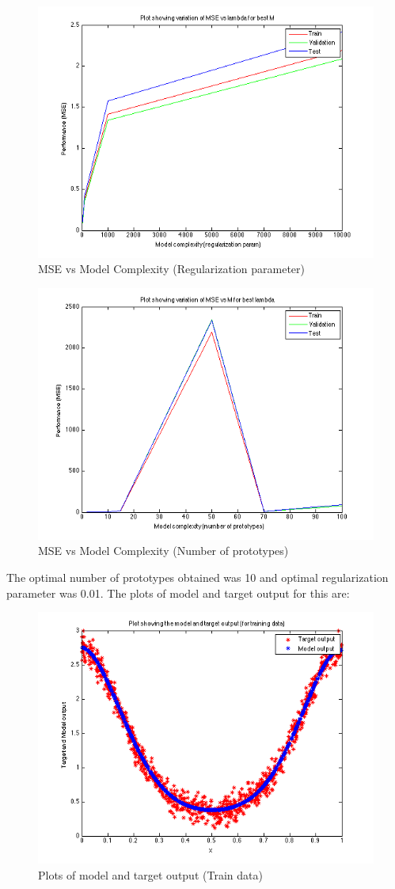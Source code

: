 \documentclass{article}
\begin{document}
\begin{figure}[H]
\centering
\includegraphics[width=0.8\linewidth]{Regression/rbfnn_univariate/mse_lambda.png}
\caption{MSE vs Model Complexity (Regularization parameter)}
\end{figure}

\begin{figure}[H]
\centering
\includegraphics[width=0.8\linewidth]{Regression/rbfnn_univariate/mse_m.png}
\caption{MSE vs Model Complexity (Number of prototypes)}
\end{figure}

The optimal number of prototypes obtained was 10 and optimal regularization parameter was 0.01. The plots of model and target output for this are:

\begin{figure}[H]
\centering
\includegraphics[width=0.5\linewidth]{Regression/rbfnn_univariate/output_train.png}
\caption{Plots of model and target output (Train data)}
\end{figure}
\end{document}
